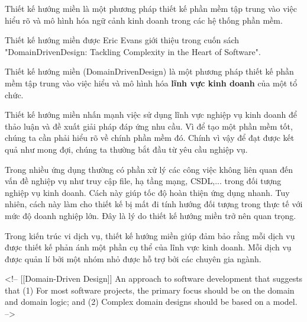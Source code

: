 Thiết kế hướng miền là một phương pháp thiết kế phần mềm tập trung vào việc hiểu rõ và mô hình hóa ngữ cảnh kinh doanh trong các hệ thống phần mềm.

Thiết kế hướng miền được Eric Evans giới thiệu trong cuốn sách "DomainDrivenDesign: Tackling Complexity in the Heart of Software".

Thiết kế hướng miền (DomainDrivenDesign) là một phương pháp thiết kế phần mềm tập trung vào việc hiểu và mô hình hóa \textbf{lĩnh vực kinh doanh} của một tổ chức.

Thiết kế hướng miền nhấn mạnh việc sử dụng lĩnh vực nghiệp vụ kinh doanh để thảo luận và đề xuất giải pháp đáp ứng nhu cầu. Vì để tạo một phần mềm tốt, chúng ta cần phải hiểu rõ về chính phần mềm đó. Chính vì vậy để đạt được kết quả như mong đợi, chúng ta thường bắt đầu từ yêu cầu nghiệp vụ.

Trong nhiều ứng dụng thường có phần xử lý các công việc không liên quan đến vấn đề nghiệp vụ như truy cập file, hạ tầng mạng, CSDL,... trong đối tượng nghiệp vụ kinh doanh. Cách này giúp tốc độ hoàn thiện ứng dụng nhanh. Tuy nhiên, cách này làm cho thiết kế bị mất đi tính hướng đối tượng trong thực tế với mức độ doanh nghiệp lớn. Đây là lý do thiết kế hướng miền trở nên quan trọng.

Trong kiến trúc vi dịch vụ, thiết kế hướng miền giúp đảm bảo rằng mỗi dịch vụ được thiết kế phản ánh một phần cụ thể của lĩnh vực kinh doanh. Mỗi dịch vụ được quản lí bởi một nhóm nhỏ được hỗ trợ bởi các chuyên gia ngành.

<!-- [[Domain-Driven Design]] An approach to software development that suggests that (1) For most software projects, the primary focus should be on the domain and domain logic; and (2) Complex domain designs should be based on a model. -->


